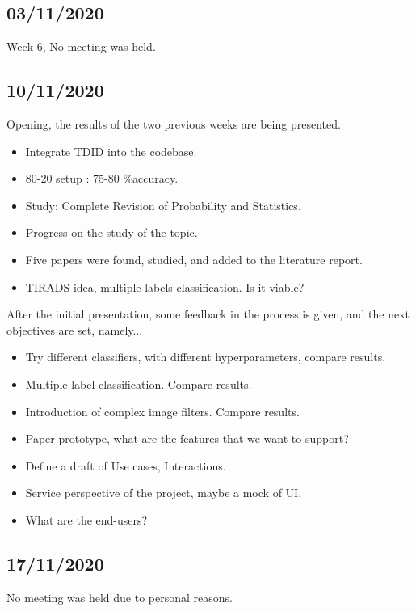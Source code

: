 \documentclass[a4paper,11pt,oneside]{book}
\begin{document}
	\subsection{03/11/2020}
	Week 6, No meeting was held.
	\subsection{10/11/2020}
	Opening, the results of the two previous weeks are being presented.
	\begin{itemize}
		\item Integrate TDID into the codebase.
		\item 80-20 setup : 75-80 \%accuracy.
		\item Study: Complete Revision of Probability and Statistics.
		\item Progress on the study of the topic.
		\item Five papers were found, studied, and added to the literature report.
		\item TIRADS idea, multiple labels classification. Is it viable?
	\end{itemize}	
	After the initial presentation, some feedback in the process is given, and the next objectives are set, namely...
	\begin{itemize}
		\item Try different classifiers, with different hyperparameters, compare results.
		\item Multiple label classification. Compare results.
		\item Introduction of complex image filters. Compare results.
		\item Paper prototype, what are the features that we want to support?
		\item Define a draft of Use cases, Interactions.
		\item Service perspective of the project, maybe a mock of UI.
		\item What are the end-users?
	\end{itemize}
	\subsection{17/11/2020}
	No meeting was held due to personal reasons.
\end{document}
